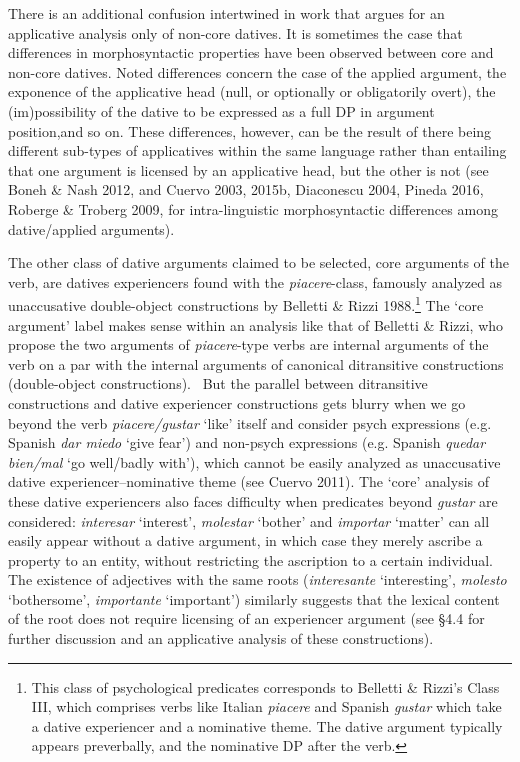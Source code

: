 \documentclass[12pt]{article}
\newenvironment{styleStandard}{\setlength\leftskip{0cm}\setlength\rightskip{0cm plus 1fil}\setlength\parindent{0cm}\setlength\parfillskip{0pt plus 1fil}\setlength\parskip{0in plus 1pt}\writerlistparindent\writerlistleftskip\leavevmode\normalfont\normalsize\writerlistlabel\ignorespaces}{\unskip\vspace{0.111in plus 0.0111in}\par}
\newcommand\writerlistleftskip{}
\newcommand\writerlistparindent{}
\newcommand\writerlistlabel{}
\begin{document}
\begin{styleStandard}
There is an additional confusion intertwined in work that argues for an applicative analysis only of non-core datives. It is sometimes the case that differences in morphosyntactic properties have been observed between core and non-core datives. Noted differences concern the case of the applied argument, the exponence of the applicative head (null, or optionally or obligatorily overt), the (im)possibility of the dative to be expressed as a full DP in argument position,and so on. These differences, however, can be the result of there being different sub-types of applicatives within the same language rather than entailing that one argument is licensed by an applicative head, but the other is not (see Boneh \& Nash 2012, and Cuervo 2003, 2015b, Diaconescu 2004, Pineda 2016, Roberge \& Troberg 2009, for intra-linguistic morphosyntactic differences among dative/applied arguments). 
\end{styleStandard}

\begin{styleStandard}
The other class of dative arguments claimed to be selected, core arguments of the verb, are datives experiencers found with the \textit{piacere}{}-class, famously analyzed as unaccusative double-object constructions by Belletti \& Rizzi 1988.\footnote{ This class of psychological predicates corresponds to Belletti \& Rizzi’s Class III, which comprises verbs like Italian \textit{piacere} and Spanish \textit{gustar} which take a dative experiencer and a nominative theme. The dative argument typically appears preverbally, and the nominative DP after the verb. } The ‘core argument’ label makes sense within an analysis like that of Belletti \& Rizzi, who propose the two arguments of \textit{piacere}{}-type verbs are internal arguments of the verb on a par with the internal arguments of canonical ditransitive constructions (double-object constructions). \ But the parallel between ditransitive constructions and dative experiencer constructions gets blurry when we go beyond the verb \textit{piacere/gustar} ‘like’ itself and consider psych expressions (e.g. Spanish \textit{dar miedo} ‘give fear’) and non-psych expressions (e.g. Spanish \textit{quedar bien/mal} ‘go well/badly with’), which cannot be easily analyzed as unaccusative dative experiencer–nominative theme (see Cuervo 2011). The ‘core’ analysis of these dative experiencers also faces difficulty when predicates beyond \textit{gustar} are considered: \textit{interesar} ‘interest’, \textit{molestar} ‘bother’ and \textit{importar} ‘matter’ can all easily appear without a dative argument, in which case they merely ascribe a property to an entity, without restricting the ascription to a certain individual. The existence of adjectives with the same roots (\textit{interesante} ‘interesting’, \textit{molesto} ‘bothersome’, \textit{importante} ‘important’) similarly suggests that the lexical content of the root does not require licensing of an experiencer argument (see §4.4 for further discussion and an applicative analysis of these constructions).
\end{styleStandard}
\end{document}

